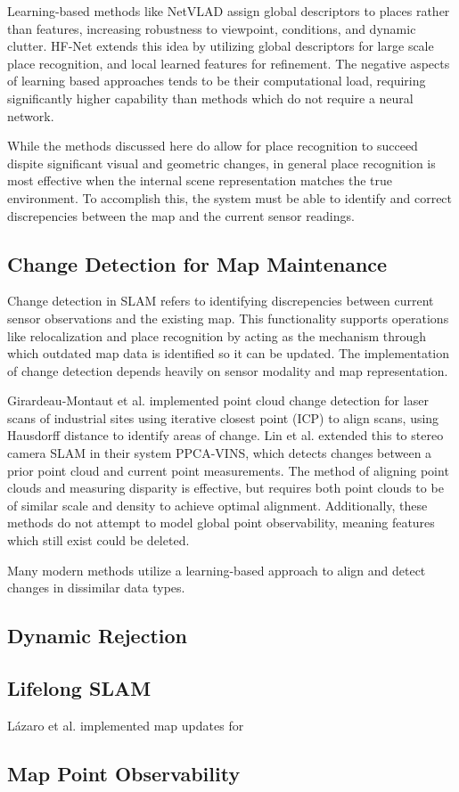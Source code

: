 Learning-based methods like NetVLAD \cite{arandjelovicNetVLADCNNArchitecture2016} assign global descriptors to places rather than features, increasing robustness to viewpoint, conditions, and dynamic clutter. HF-Net \cite{sarlinCoarseFineRobust2019} extends this idea by utilizing global descriptors for large scale place recognition, and local learned features for refinement. The negative aspects of learning based approaches tends to be their computational load, requiring significantly higher capability than methods which do not require a neural network.

While the methods discussed here do allow for place recognition to succeed dispite significant visual and geometric changes, in general place recognition is most effective when the internal scene representation matches the true environment. To accomplish this, the system must be able to identify and correct discrepencies between the map and the current sensor readings.

\subsection{Change Detection for Map Maintenance}

Change detection in SLAM refers to identifying discrepencies between current sensor observations and the existing map. This functionality supports operations like relocalization and place recognition by acting as the mechanism through which outdated map data is identified so it can be updated. The implementation of change detection depends heavily on sensor modality and map representation.

Girardeau-Montaut et al. \cite{girardeau-montautCHANGEDETECTIONPOINTS2005} implemented point cloud change detection for laser scans of industrial sites using iterative closest point (ICP) \cite{arunLeastSquaresFittingTwo1987}
\cite{beslMethodRegistration3D1992} to align scans, using Hausdorff distance \cite{aspertMESHMeasuringErrors2002} to identify areas of change. Lin et al. \cite{linPointCloudChange2022} extended this to stereo camera SLAM in their system PPCA-VINS, which detects changes between a prior point cloud and current point measurements. The method of aligning point clouds and measuring disparity is effective, but requires both point clouds to be of similar scale and density to achieve optimal alignment. Additionally, these methods do not attempt to model global point observability, meaning features which still exist could be deleted.

Many modern methods utilize a learning-based approach to align and detect changes in dissimilar data types. 

\subsection{Dynamic Rejection}

\subsection{Lifelong SLAM}
Lázaro et al. implemented map updates for

\subsection{Map Point Observability}
